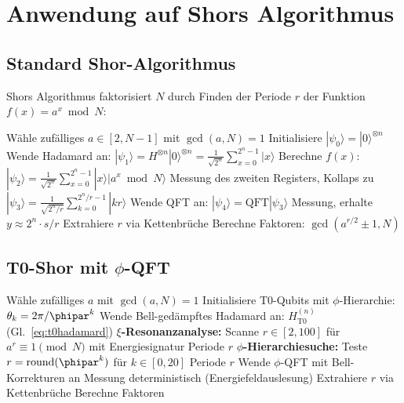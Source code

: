 \section{Anwendung auf Shors Algorithmus}
\label{sec:shor}

\subsection{Standard Shor-Algorithmus}

Shors Algorithmus faktorisiert $N$ durch Finden der Periode $r$ der Funktion $f(x) = a^x \bmod N$:

\begin{algorithm}[H]
	\caption{Standard Shor-Algorithmus}
	\begin{algorithmic}[1]
		\STATE Wähle zufälliges $a \in [2, N-1]$ mit $\gcd(a, N) = 1$
		\STATE Initialisiere $|\psi_0\rangle = |0\rangle^{\otimes n}$
		\STATE Wende Hadamard an: $|\psi_1\rangle = H^{\otimes n}|0\rangle^{\otimes n} = \frac{1}{\sqrt{2^n}}\sum_{x=0}^{2^n-1}|x\rangle$
		\STATE Berechne $f(x)$: $|\psi_2\rangle = \frac{1}{\sqrt{2^n}}\sum_{x=0}^{2^n-1}|x\rangle|a^x \bmod N\rangle$
		\STATE Messung des zweiten Registers, Kollaps zu $|\psi_3\rangle = \frac{1}{\sqrt{2^n/r}}\sum_{k=0}^{2^n/r-1}|kr\rangle$
		\STATE Wende QFT an: $|\psi_4\rangle = \text{QFT}|\psi_3\rangle$
		\STATE Messung, erhalte $y \approx 2^n \cdot s/r$
		\STATE Extrahiere $r$ via Kettenbrüche
		\STATE Berechne Faktoren: $\gcd(a^{r/2} \pm 1, N)$
	\end{algorithmic}
\end{algorithm}

\subsection{T0-Shor mit $\phi$-QFT}

\begin{algorithm}[H]
	\caption{T0-Shor-Algorithmus}
	\begin{algorithmic}[1]
		\STATE Wähle zufälliges $a$ mit $\gcd(a, N) = 1$
		\STATE Initialisiere T0-Qubits mit $\phi$-Hierarchie: $\theta_k = 2\pi/\phipar^k$
		\STATE Wende Bell-gedämpftes Hadamard an: $H_{\text{T0}}^{(n)}$ (Gl.~\ref{eq:t0hadamard})
		\STATE \textbf{$\xi$-Resonanzanalyse:} Scanne $r \in [2, 100]$ für $a^r \equiv 1 \pmod{N}$ mit Energiesignatur
		 \RETURN Periode $r$
		\ENDIF
		\STATE \textbf{$\phi$-Hierarchiesuche:} Teste $r = \text{round}(\phipar^k)$ für $k \in [0, 20]$
		 \RETURN Periode $r$
		\ENDIF
		\STATE Wende $\phi$-QFT mit Bell-Korrekturen an
		\STATE Messung deterministisch (Energiefeldauslesung)
		\STATE Extrahiere $r$ via Kettenbrüche
		\STATE Berechne Faktoren
	\end{algorithmic}
\end{algorithm}


